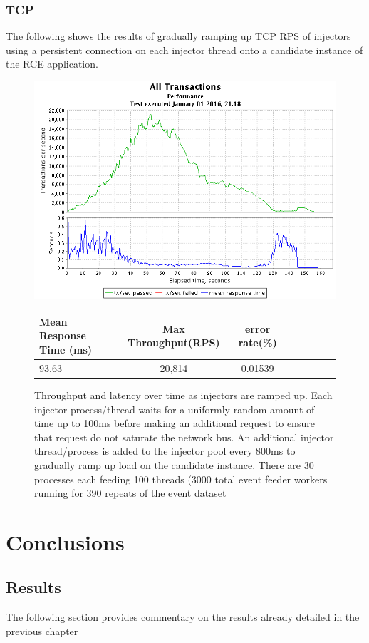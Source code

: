 \documentclass[a4paper,11pt]{scrreprt}
\begin{document}
\subsection{TCP}

The following shows the results of gradually ramping up TCP RPS of injectors using a persistent connection on each injector thread onto a candidate instance of the RCE application.
\begin{figure}[h!]
\centering
\caption{Throughput and latency over time as injectors are ramped up. Each injector process/thread waits for a uniformly random amount of time up to 100ms before making an additional request to ensure that request do not saturate the network bus. An additional injector thread/process is added to the injector pool every 800ms to gradually ramp up load on the candidate instance. There are 30 processes each feeding 100 threads (3000 total event feeder workers running for 390 repeats of the event dataset}
\includegraphics[scale=0.6, trim=0 -25 0 2, clip=true] {TCP_throughput.png}
\label{fig:udpthroughput}
\begin{tabular}{l*{6}{c}r}
Mean Response Time (ms) & Max Throughput(RPS) & error rate(\%)\\
\hline
93.63 & 20,814 & 0.01539
\end{tabular}
\end{figure}
\clearpage

\chapter{Conclusions}
\section{Results}
The following section provides commentary on the results already detailed in the previous chapter
\end{document}

